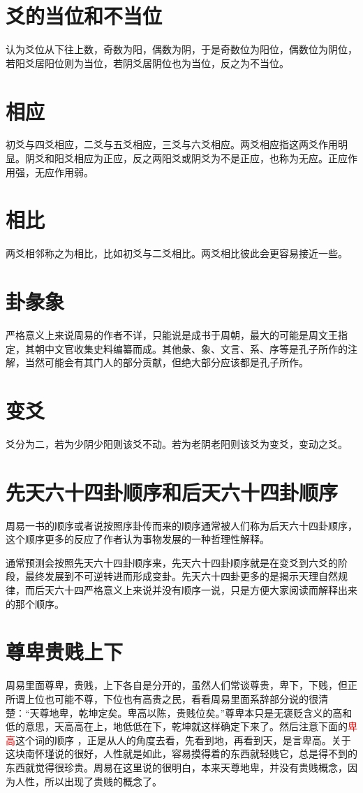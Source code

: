 \documentclass[12pt,oneside]{book}
\renewcommand{\emph}[1]{\textcolor{red}{#1}}
\begin{document}
\section{爻的当位和不当位}
认为爻位从下往上数，奇数为阳，偶数为阴，于是奇数位为阳位，偶数位为阴位，若阳爻居阳位则为当位，若阴爻居阴位也为当位，反之为不当位。

\section{相应}
初爻与四爻相应，二爻与五爻相应，三爻与六爻相应。两爻相应指这两爻作用明显。阴爻和阳爻相应为正应，反之两阳爻或阴爻为不是正应，也称为无应。正应作用强，无应作用弱。

\section{相比}
两爻相邻称之为相比，比如初爻与二爻相比。两爻相比彼此会更容易接近一些。

\section{卦彖象}
严格意义上来说周易的作者不详，只能说是成书于周朝，最大的可能是周文王指定，其朝中文官收集史料编纂而成。其他彖、象、文言、系、序等是孔子所作的注解，当然可能会有其门人的部分贡献，但绝大部分应该都是孔子所作。

\section{变爻}
爻分为二，若为少阴少阳则该爻不动。若为老阴老阳则该爻为变爻，变动之爻。

\section{先天六十四卦顺序和后天六十四卦顺序}
周易一书的顺序或者说按照序卦传而来的顺序通常被人们称为后天六十四卦顺序，这个顺序更多的反应了作者认为事物发展的一种哲理性解释。

通常预测会按照先天六十四卦顺序来，先天六十四卦顺序就是在变爻到六爻的阶段，最终发展到不可逆转进而形成变卦。先天六十四卦更多的是揭示天理自然规律，而后天六十四严格意义上来说并没有顺序一说，只是方便大家阅读而解释出来的那个顺序。

\section{尊卑贵贱上下}
周易里面尊卑，贵贱，上下各自是分开的，虽然人们常谈尊贵，卑下，下贱，但正所谓上位也可能不尊，下位也有高贵之民，看看周易里面系辞部分说的很清楚：“天尊地卑，乾坤定矣。卑高以陈，贵贱位矣。”尊卑本只是无褒贬含义的高和低的意思，天高高在上，地低低在下，乾坤就这样确定下来了。然后注意下面的\emph{卑高}这个词的顺序 ，正是从人的角度去看，先看到地，再看到天，是言卑高。关于这块南怀瑾说的很好，人性就是如此，容易摸得着的东西就轻贱它，总是得不到的东西就觉得很珍贵。周易在这里说的很明白，本来天尊地卑，并没有贵贱概念，因为人性，所以出现了贵贱的概念了。
\end{document}
